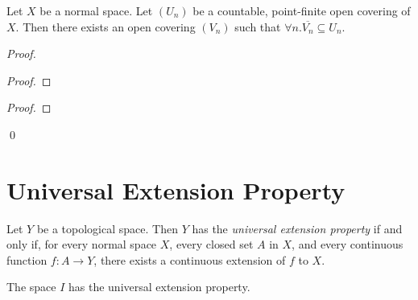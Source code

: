 \begin{lemma}
    Let $X$ be a normal space. Let $(U_n)$ be a countable, point-finite open covering of $X$.
    Then there exists an open covering $(V_n)$ such that $\forall n. \overline{V_n} \subseteq U_n$.
\end{lemma}

\begin{proof}
    \pf
    \begin{proof}
    \end{proof}
    \begin{proof}
    \end{proof}
    \qed
\end{proof}

\section{Universal Extension Property}

\begin{definition}
    Let $Y$ be a topological space. Then $Y$ has the \emph{universal extension property}
    if and only if, for every normal space $X$, every closed set $A$ in $X$, and every
    continuous function $f : A \rightarrow Y$, there exists a continuous extension of
    $f$ to $X$.
\end{definition}

\begin{theorem}
    \label{theorem:tietze}
    The space $I$ has the universal extension property.
\end{theorem}

